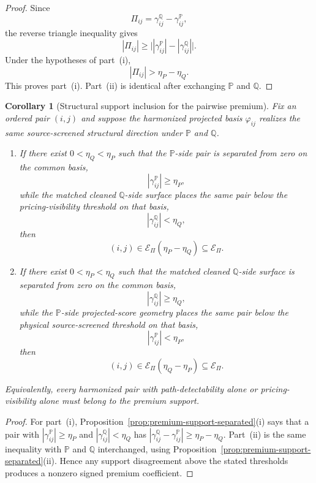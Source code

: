 \documentclass[11pt,a4paper]{amsart}
\theoremstyle{plain}
\newtheorem{corollary}[theorem]{Corollary}
\theoremstyle{definition}
\theoremstyle{remark}
\newcommand{\PP}{\mathbb{P}}
\newcommand{\QQ}{\mathbb{Q}}
\newcommand{\cE}{\mathcal{E}}
\begin{document}
\begin{proof}
Since
\[
        \Pi_{ij}=\gamma_{ij}^\QQ-\gamma_{ij}^\PP,
\]
the reverse triangle inequality gives
\[
        |\Pi_{ij}|
        \ge
        \bigl||\gamma_{ij}^\PP|-|\gamma_{ij}^\QQ|\bigr|.
\]
Under the hypotheses of part~(i),
\[
        |\Pi_{ij}|
        >
        \eta_P-\eta_Q.
\]
This proves part~(i).  Part~(ii) is identical after exchanging \(\PP\) and \(\QQ\).
\end{proof}

\begin{corollary}[Structural support inclusion for the pairwise premium]\label{cor:premium-support-structural}
Fix an ordered pair \((i,j)\) and suppose the harmonized projected basis \(\varphi_{ij}\) realizes
the same source-screened structural direction under \(\PP\) and \(\QQ\).
\begin{enumerate}[label=(\roman*)]
\item If there exist \(0<\eta_Q<\eta_P\) such that the \(\PP\)-side pair is separated from zero on
the common basis,
\[
        |\gamma_{ij}^\PP|\ge \eta_P,
\]
while the matched cleaned \(\QQ\)-side surface places the same pair below the pricing-visibility
threshold on that basis,
\[
        |\gamma_{ij}^\QQ|<\eta_Q,
\]
then
\[
        (i,j)\in \cE_\Pi(\eta_P-\eta_Q)\subseteq \cE_\Pi.
\]
\item If there exist \(0<\eta_P<\eta_Q\) such that the matched cleaned \(\QQ\)-side surface is
separated from zero on the common basis,
\[
        |\gamma_{ij}^\QQ|\ge \eta_Q,
\]
while the \(\PP\)-side projected-score geometry places the same pair below the physical
source-screened threshold on that basis,
\[
        |\gamma_{ij}^\PP|<\eta_P,
\]
then
\[
        (i,j)\in \cE_\Pi(\eta_Q-\eta_P)\subseteq \cE_\Pi.
\]
\end{enumerate}
Equivalently, every harmonized pair with path-detectability alone or pricing-visibility alone
must belong to the premium support.
\end{corollary}

\begin{proof}
For part~(i), Proposition~\ref{prop:premium-support-separated}(i) says that a pair with
\(|\gamma_{ij}^{\PP}|\ge\eta_P\) and \(|\gamma_{ij}^{\QQ}|<\eta_Q\) has
\(|\gamma_{ij}^{\QQ}-\gamma_{ij}^{\PP}|\ge \eta_P-\eta_Q\).  Part~(ii) is the same inequality with
\(\PP\) and \(\QQ\) interchanged, using Proposition~\ref{prop:premium-support-separated}(ii).
Hence any support disagreement above the stated thresholds produces a nonzero signed premium
coefficient.
\end{proof}
\end{document}
